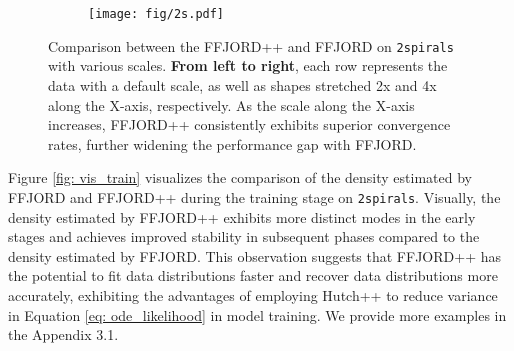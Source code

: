 \begin{figure*}[!t]
    \centering
    \begin{subfigure}[b]{0.9\textwidth}
        \centering
        \texttt{[image: fig/2s.pdf]}
        \label{fig: scale_x1}
        \vspace{-4mm}
    \end{subfigure}
    \vspace{-3mm}
    \caption{\small Comparison between the FFJORD++ and FFJORD on \texttt{2spirals} with various scales. \textbf{From left to right}, each row represents the data with a default scale, as well as shapes stretched 2x and 4x along the X-axis, respectively. As the scale along the X-axis increases, FFJORD++ consistently exhibits superior convergence rates, further widening the performance gap with FFJORD.}
    \vspace{-3mm}
    \label{fig: condition_num}
\end{figure*}
Figure \ref{fig: vis_train} visualizes the comparison of the density estimated by FFJORD and FFJORD++ during the training stage on \texttt{2spirals}. 
Visually, the density estimated by FFJORD++ exhibits more distinct modes in the early stages and achieves improved stability in subsequent phases compared to the density estimated by FFJORD. 
This observation suggests that FFJORD++ has the potential to fit data distributions faster and recover data distributions more accurately, exhibiting the advantages of employing Hutch++ to reduce variance in Equation \ref{eq: ode_likelihood} in model training. We provide more examples in the Appendix 3.1.



